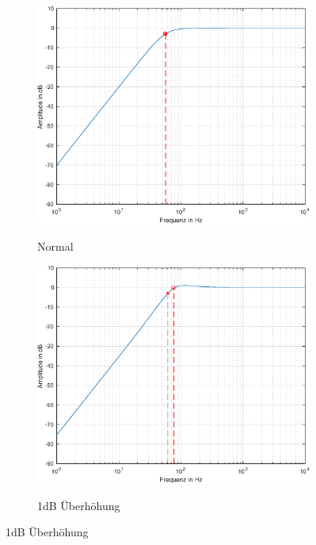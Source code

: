 \begin{figure}[bth]
    \centering
    \begin{subfigure}{.49\textwidth}
        \centering
        \caption{Normal}
        \includegraphics[width=0.85\linewidth]{Figures/Normaler_Frequenzgang.eps}
        \label{Normaler_Frequenzgang}
    \end{subfigure}%
    \begin{subfigure}{.49\textwidth}
        \centering
        \caption{1dB Überhöhung}
        \includegraphics[width=0.85\linewidth]{Figures/Frequenzgang_1dB.eps}
        \label{Frequenzgang_1dB}
    \end{subfigure}


\end{figure}
